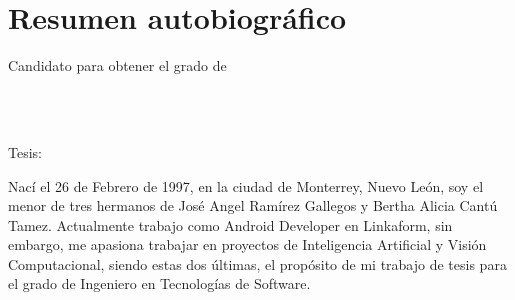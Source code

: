
\chapter*{Resumen autobiográfico}
\thispagestyle{empty}

\begin{center}
\autor

Candidato para obtener el grado de\\
\grado\\
\orientacion\bigskip

\uanl\\
\fime\bigskip

Tesis:\\
\textsc{\large\titulo}
\end{center}\bigskip

Nací el 26 de Febrero de 1997, en la ciudad de Monterrey, Nuevo León, soy el menor de tres hermanos de José Angel Ramírez Gallegos y Bertha Alicia Cantú Tamez. Actualmente trabajo como Android Developer en Linkaform, sin embargo, me apasiona trabajar en proyectos de Inteligencia Artificial y Visión Computacional, siendo estas dos últimas, el propósito de mi trabajo de tesis para el grado de Ingeniero en Tecnologías de Software.

